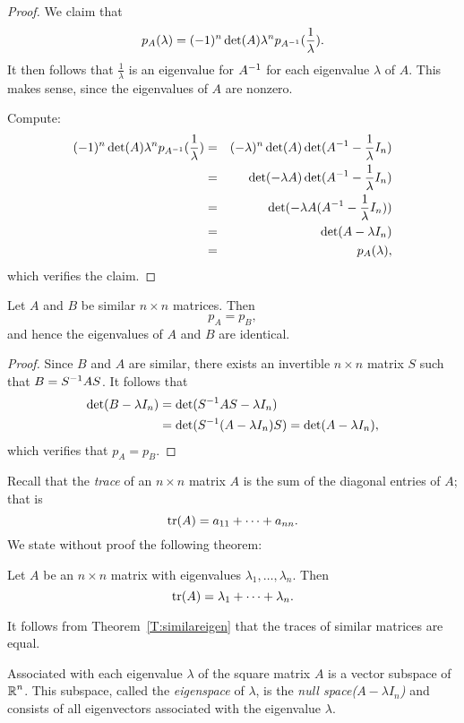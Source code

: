 \documentclass{ximera}
\begin{document}
\begin{proof}  We claim that  
\[
p_A(\lambda) = (-1)^n \det(A) \lambda^n p_{A^{-1}}(\frac{1}{\lambda}).
\]
It then follows that $\frac{1}{\lambda}$ is an eigenvalue for
$A^{-1}$ for each eigenvalue $\lambda$ of $A$.  This makes sense,
since the eigenvalues of $A$ are nonzero. 

Compute:
\begin{eqnarray*}
(-1)^n \det(A) \lambda^n p_{A^{-1}}(\frac{1}{\lambda}) & = &
 (-\lambda)^n \det(A)\det(A^{-1}-\frac{1}{\lambda}I_n) \\
& = & \det(-\lambda A)\det(A^{-1}-\frac{1}{\lambda}I_n)\\
& = & \det(-\lambda A (A^{-1}-\frac{1}{\lambda}I_n))\\
& = & \det(A-\lambda I_n) \\
& = & p_A(\lambda),
\end{eqnarray*}
which verifies the claim.  \end{proof}

\begin{theorem}  \label{T:similareigen}
Let $A$ and $B$ be similar $n\times n$ matrices.  Then
\[
p_A = p_B,
\]
and hence the eigenvalues of $A$ and $B$ are identical.
\end{theorem}  

\begin{proof}  Since $B$ and $A$ are similar, there exists an 
invertible $n\times n$ matrix $S$ such that $B=S^{-1} AS$.  It 
follows that 
\begin{align*}
\det(B-\lambda I_n) &= \det(S^{-1} AS-\lambda I_n) \\
&= \det(S^{-1}(A-\lambda I_n)S) = \det(A-\lambda I_n),
\end{align*}
which verifies that $p_A=p_B$.  \end{proof}

Recall that the {\em trace\/} of an 
$n\times n$ matrix $A$ is
the sum of the diagonal entries of $A$; that is
\[
{\rm tr}(A) = a_{11} +\cdots+ a_{nn}.
\]
We state without proof the following theorem:
\begin{theorem} \label{T:tracen}
Let $A$ be an $n\times n$ matrix with eigenvalues
$\lambda_1,\ldots,\lambda_n$.  Then
\[
{\rm tr}(A) = \lambda_1 + \cdots + \lambda_n.
\]
\end{theorem}

It follows from Theorem~\ref{T:similareigen} that the traces of
similar matrices are equal.

\begin{definition} \label{D:eigenspace} {\rm
Associated with each eigenvalue $\lambda$ of the square 
matrix $A$  is a vector subspace of $\mbox{$\mathbb{R}$}^n$. This subspace, called the 
{\em eigenspace} of $\lambda$, is the {\em null space($A-\lambda I_n$)} and 
consists of all eigenvectors associated with the eigenvalue $\lambda$.}
\end{definition}
\end{document}
